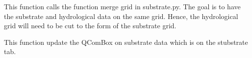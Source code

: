 \documentclass[letterpaper,10pt,english]{sphinxmanual}
\begin{document}
\begin{fulllineitems}
\begin{fulllineitems}
\begin{quote}
\begin{description}
\end{description}\end{quote}

\end{fulllineitems}


\begin{fulllineitems}
\label{\detokenize{index:src_GUI.hydro_GUI_2.SubstrateW.send_merge_grid}}
This function calls the function merge grid in substrate.py. The goal is to have the substrate and hydrological
data on the same grid. Hence, the hydrological grid will need to be cut to the form of the substrate grid.

\end{fulllineitems}


\begin{fulllineitems}
\label{\detokenize{index:src_GUI.hydro_GUI_2.SubstrateW.update_sub_hdf5_name}}
This function update the QComBox on substrate data which is on the stubstrate tab.

\end{fulllineitems}


\end{fulllineitems}

\end{document}

